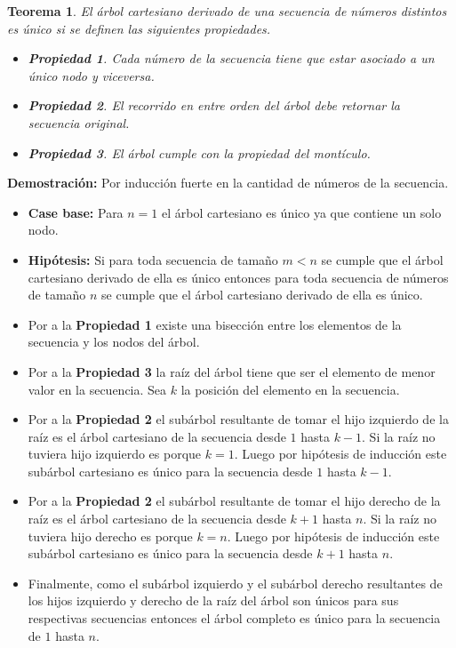 \documentclass[12pt]{article}
\newcommand{\proof}{\textbf{Demostración:} }
\newcommand{\ct}{árbol cartesiano }
\newtheorem{theorem}{Teorema}
\newtheorem{propertie}{Propiedad}
\begin{document}
\begin{theorem}
	El \ct derivado de una secuencia de números distintos es único si se definen las siguientes propiedades.
	\begin{itemize}
		\item \begin{propertie} Cada número de la secuencia tiene que estar asociado a un único nodo y viceversa. \end{propertie}
		\item \begin{propertie} El recorrido en entre orden del árbol debe retornar la secuencia original. \end{propertie}
		\item \begin{propertie} El árbol cumple con la propiedad del montículo. \end{propertie}
	\end{itemize}
\end{theorem}

\proof Por inducción fuerte en la cantidad de números de la secuencia.
\begin{itemize}
	\item \textbf{Case base:} Para $n = 1$ el \ct es único ya que contiene un solo nodo.
	\item \textbf{Hipótesis:} Si para toda secuencia de tamaño $m < n$ se cumple que el \ct derivado de ella es único entonces para toda secuencia de números de tamaño $n$ se cumple que el \ct derivado de ella es único.
	\item Por a la \textbf{Propiedad 1} existe una bisección entre los elementos de la secuencia y los nodos del árbol.
	\item Por a la \textbf{Propiedad 3} la raíz del árbol tiene que ser el elemento de menor valor en la secuencia. Sea $k$ la posición del elemento en la secuencia.
	\item Por a la \textbf{Propiedad 2} el subárbol resultante de tomar el hijo izquierdo de la raíz es el \ct de la secuencia desde $1$ hasta $k - 1$. Si la raíz no tuviera hijo izquierdo es porque $k = 1$. Luego por hipótesis de inducción este subárbol cartesiano es único para la secuencia desde $1$ hasta $k - 1$.
	\item Por a la \textbf{Propiedad 2} el subárbol resultante de tomar el hijo derecho de la raíz es el \ct de la secuencia desde $k + 1$ hasta $n$. Si la raíz no tuviera hijo derecho es porque $k = n$. Luego por hipótesis de inducción este subárbol cartesiano es único para la secuencia desde $k + 1$ hasta $n$.
	\item Finalmente, como el subárbol izquierdo y el subárbol derecho resultantes de los hijos izquierdo y derecho de la raíz del árbol son únicos para sus respectivas secuencias entonces el árbol completo es único para la secuencia de $1$ hasta $n$. 
\end{itemize}
\end{document}
